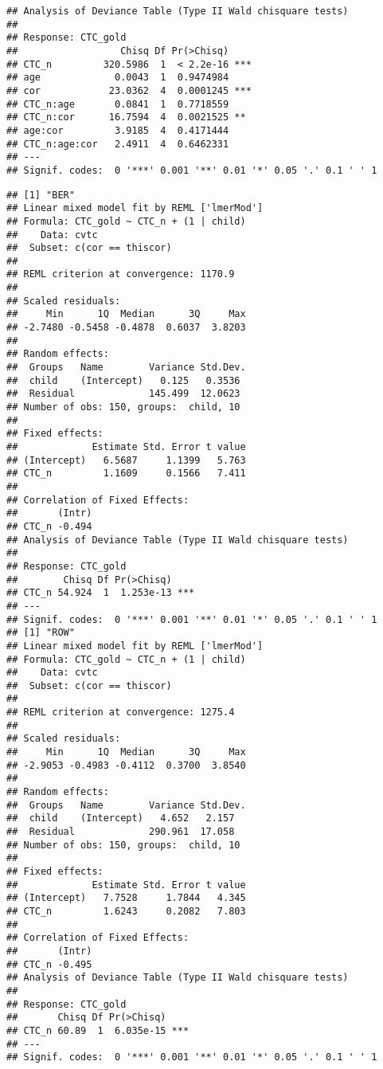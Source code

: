 \documentclass[english,floatsintext,man]{apa6}
\begin{document}
\begin{verbatim}
## Analysis of Deviance Table (Type II Wald chisquare tests)
## 
## Response: CTC_gold
##                  Chisq Df Pr(>Chisq)    
## CTC_n         320.5986  1  < 2.2e-16 ***
## age             0.0043  1  0.9474984    
## cor            23.0362  4  0.0001245 ***
## CTC_n:age       0.0841  1  0.7718559    
## CTC_n:cor      16.7594  4  0.0021525 ** 
## age:cor         3.9185  4  0.4171444    
## CTC_n:age:cor   2.4911  4  0.6462331    
## ---
## Signif. codes:  0 '***' 0.001 '**' 0.01 '*' 0.05 '.' 0.1 ' ' 1
\end{verbatim}

\begin{verbatim}
## [1] "BER"
## Linear mixed model fit by REML ['lmerMod']
## Formula: CTC_gold ~ CTC_n + (1 | child)
##    Data: cvtc
##  Subset: c(cor == thiscor)
## 
## REML criterion at convergence: 1170.9
## 
## Scaled residuals: 
##     Min      1Q  Median      3Q     Max 
## -2.7480 -0.5458 -0.4878  0.6037  3.8203 
## 
## Random effects:
##  Groups   Name        Variance Std.Dev.
##  child    (Intercept)   0.125   0.3536 
##  Residual             145.499  12.0623 
## Number of obs: 150, groups:  child, 10
## 
## Fixed effects:
##             Estimate Std. Error t value
## (Intercept)   6.5687     1.1399   5.763
## CTC_n         1.1609     0.1566   7.411
## 
## Correlation of Fixed Effects:
##       (Intr)
## CTC_n -0.494
## Analysis of Deviance Table (Type II Wald chisquare tests)
## 
## Response: CTC_gold
##        Chisq Df Pr(>Chisq)    
## CTC_n 54.924  1  1.253e-13 ***
## ---
## Signif. codes:  0 '***' 0.001 '**' 0.01 '*' 0.05 '.' 0.1 ' ' 1
## [1] "ROW"
## Linear mixed model fit by REML ['lmerMod']
## Formula: CTC_gold ~ CTC_n + (1 | child)
##    Data: cvtc
##  Subset: c(cor == thiscor)
## 
## REML criterion at convergence: 1275.4
## 
## Scaled residuals: 
##     Min      1Q  Median      3Q     Max 
## -2.9053 -0.4983 -0.4112  0.3700  3.8540 
## 
## Random effects:
##  Groups   Name        Variance Std.Dev.
##  child    (Intercept)   4.652   2.157  
##  Residual             290.961  17.058  
## Number of obs: 150, groups:  child, 10
## 
## Fixed effects:
##             Estimate Std. Error t value
## (Intercept)   7.7528     1.7844   4.345
## CTC_n         1.6243     0.2082   7.803
## 
## Correlation of Fixed Effects:
##       (Intr)
## CTC_n -0.495
## Analysis of Deviance Table (Type II Wald chisquare tests)
## 
## Response: CTC_gold
##       Chisq Df Pr(>Chisq)    
## CTC_n 60.89  1  6.035e-15 ***
## ---
## Signif. codes:  0 '***' 0.001 '**' 0.01 '*' 0.05 '.' 0.1 ' ' 1

\end{verbatim}
\end{document}

